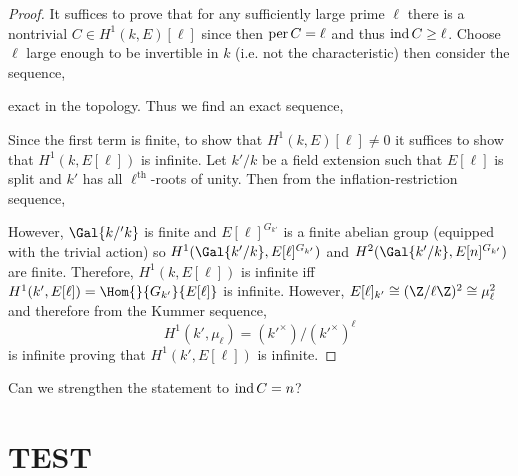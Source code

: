 \documentclass[12pt]{article}
\begin{document}
\begin{proof}
It suffices to prove that for any sufficiently large prime $\ell$ there is a nontrivial $C \in H^1(k, E)[\ell]$ since then $\operatorname{per}{C} = \ell$ and thus $\operatorname{ind}{C} \ge \ell$. Choose $\ell$ large enough to be invertible in $k$ (i.e. not the characteristic) then consider the sequence,
\begin{center}
\end{center}
exact in the \etale topology. Thus we find an exact sequence,
\begin{center}
\end{center}
Since the first term is finite, to show that $H^1(k, E)[\ell] \neq 0$ it suffices to show that $H^1(k, E[\ell])$ is infinite. Let $k'/k$ be a field extension such that $E[\ell]$ is split and $k'$ has all $\ell^{\text{th}}$-roots of unity. Then from the inflation-restriction sequence,
\begin{center}
\end{center}
However, $\Gal{k/'k}$ is finite and $E[\ell]^{G_{k'}}$ is a finite abelian group (equipped with the trivial action) so $H^1(\Gal{k'/k}, E[\ell]^{G_{k'}})$ and $H^2(\Gal{k'/k}, E[n]^{G_{k'}})$ are finite. Therefore, $H^1(k, E[\ell])$ is infinite iff $H^1(k', E[\ell]) = \Hom{}{G_{k'}}{E[\ell]}$ is infinite. However, $E[\ell]_{k'} \cong (\Z / \ell \Z)^2 \cong \mu_\ell^2$ and therefore from the Kummer sequence, 
\[ H^1(k', \mu_\ell) = (k'^\times) / (k'^\times)^\ell \]
is infinite proving that $H^1(k', E[\ell])$ is infinite.
\end{proof}


\begin{rmk}
Can we strengthen the statement to $\operatorname{ind}{C} = n$?
\end{rmk}

\section{TEST}
\end{document}
